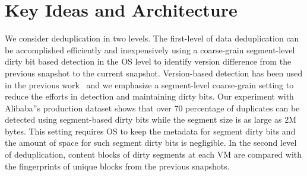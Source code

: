 \section{ Key Ideas and Architecture}
\label{sect:arch}




We consider deduplication in two levels. The first-level of data deduplication can be accomplished efficiently and 
inexpensively using a coarse-grain segment-level  dirty bit based detection in the OS level  to 
identify version difference from the previous snapshot to the current snapshot.  
Version-based detection has been used in the previous work~\cite{Clements2009,Vrable2009,TanIPDPS2011} and
we emphasize a segment-level coarse-grain setting to reduce the efforts in detection and maintaining dirty bits. 
Our experiment with Alibaba''s production dataset shows that over 70 percentage of 
duplicates can be detected using segment-based dirty bits while the segment size is as large as 2M bytes.  
This setting requires OS to keep the metadata for segment dirty bits and the amount of space for such segment 
dirty bits is negligible. In the second level of deduplication, content blocks of dirty segments at each VM 
are compared with the fingerprints of unique  blocks from the previous snapshots.

